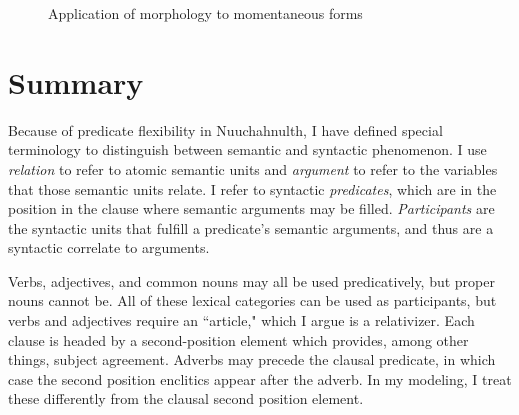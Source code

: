 \begin{figure}[H]
\begin{center}
\caption{Application of morphology to momentaneous forms}
\label{figure:momentaneousapplication}
\end{center}
\end{figure}

\section{Summary} \label{ch:clause:summary}

Because of predicate flexibility in Nuuchahnulth, I have defined special terminology to distinguish between semantic and syntactic phenomenon. I use \textit{relation} to refer to atomic semantic units and \textit{argument} to refer to the variables that those semantic units relate. I refer to syntactic \textit{predicates}, which are in the position in the clause where semantic arguments may be filled. \textit{Participants} are the syntactic units that fulfill a predicate's semantic arguments, and thus are a syntactic correlate to arguments.

Verbs, adjectives, and common nouns may all be used predicatively, but proper nouns cannot be. All of these lexical categories can be used as participants, but verbs and adjectives require an ``article," which I argue is a relativizer. Each clause is headed by a second-position element which provides, among other things, subject agreement. Adverbs may precede the clausal predicate, in which case the second position enclitics appear after the adverb. In my modeling, I treat these differently from the clausal second position element.

